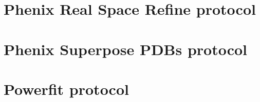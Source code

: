 \documentclass[12pt, draft]{article} %
\begin{document}
\begin{appendices}
\section{Phenix Real Space Refine protocol}
\label{app:realSpaceRefineProtocol}

\section{Phenix Superpose PDBs protocol}
\label{app:superposePdbsProtocol}

\section{Powerfit protocol}
\label{app:powerfitProtocol}








\end{appendices}
\end{document}
